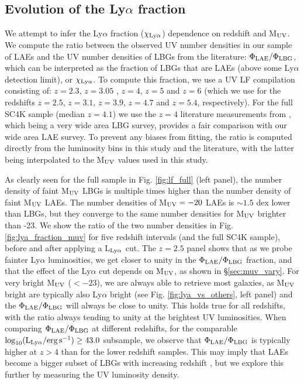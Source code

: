 \documentclass[a4paper,fleqn,usenatbib]{mnras}
\begin{document}
\subsection{Evolution of the Ly$\alpha$ fraction}  \label{sec:lya_frac_evo}

We attempt to infer the Ly$\alpha$ fraction ($\chi_{\rm Ly\alpha}$) dependence on redshift and M$_{\rm UV}$. We compute the ratio between the observed UV number densities in our sample of LAEs and the UV number densities of LBGs from the literature: $\Phi_{\rm LAE}/\Phi_{\rm LBG}$, which can be interpreted as the fraction of LBGs that are LAEs (above some Ly$\alpha$ detection limit), or $\chi_{\rm Ly\alpha}$. To compute this fraction, we use a UV LF compilation consisting of: $z=2.3$, $z=3.05$ \citep{Reddy2009}, $z=4$, $z=5$ and $z=6$ \citep{Ono2018} (which we use for the redshifts $z=2.5$, $z=3.1$, $z=3.9$, $z=4.7$ and $z=5.4$, respectively). For the full SC4K sample (median $z=4.1$) we use the $z=4$ literature measurements from \citep{Ono2018}, which being a very wide area LBG survey, provides a fair comparison with our wide area LAE survey. To prevent any biases from fitting, the ratio is computed directly from the luminosity bins in this study and the literature, with the latter being interpolated to the M$_{\rm UV}$ values used in this study.

As clearly seen for the full sample in Fig. \ref{fig:lf_full} (left panel), the number density of faint M$_{\rm UV}$ LBGs is multiple times higher than the number density of faint M$_{\rm UV}$ LAEs. The number densities of M$_{\rm UV}=-20$ LAEs is $\sim1.5$ dex lower than LBGs, but they converge to the same number densities for M$_{\rm UV}$ brighter than -23. We show the ratio of the two number densities in Fig. \ref{fig:lya_fraction_muv} for five redshift intervals (and the full SC4K sample), before and after applying a L$_{\rm Ly\alpha}$ cut. The $z=2.5$ panel shows that as we probe fainter Ly$\alpha$ luminosities, we get closer to unity in the $\Phi_{\rm LAE}/\Phi_{\rm LBG}$ fraction, and that the effect of the Ly$\alpha$ cut depends on M$_{\rm UV}$, as shown in \S\ref{sec:muv_vary}. For very bright M$_{\rm UV}$ ($<-23$), we are always able to retrieve most galaxies, as M$_{\rm UV}$ bright are typically also Ly$\alpha$ bright (see Fig. \ref{fig:lya_vs_others}, left panel) and the $\Phi_{\rm LAE}/\Phi_{\rm LBG}$ will always be close to unity. This holds true for all redshifts, with the ratio always tending to unity at the brightest UV luminosities. When comparing $\Phi_{\rm LAE}/\Phi_{\rm LBG}$ at different redshifts, for the comparable $\log_{10} (\rm L_{Ly\alpha}/erg\,s^{-1}) \geq 43.0$ subsample, we observe that $\Phi_{\rm LAE}/\Phi_{\rm LBG}$ is typically higher at $z>4$ than for the lower redshift samples. This may imply that LAEs become a bigger subset of LBGs with increasing redshift \citep[same trend found in e.g.][]{Arrabal2020}, but we explore this further by measuring the UV luminosity density.
\end{document}
